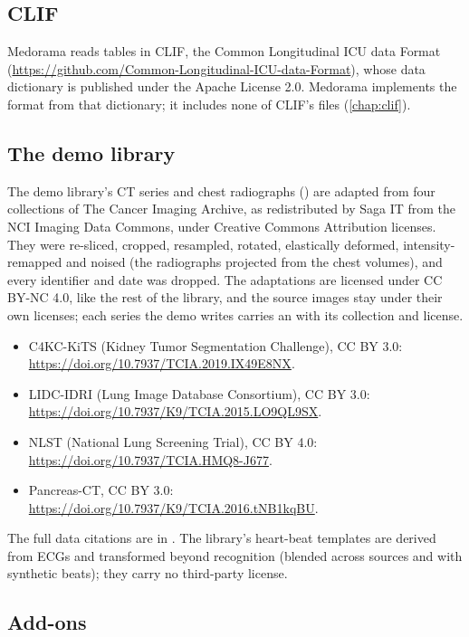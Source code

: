 \subsection{CLIF}
\label{sec:licences-clif}

Medorama reads tables in CLIF, the Common Longitudinal ICU data Format
(\url{https://github.com/Common-Longitudinal-ICU-data-Format}), whose data dictionary is published
under the Apache License 2.0. Medorama implements the format from that dictionary; it includes
none of CLIF's files (\cref{chap:clif}).

\subsection{The demo library}
\label{sec:licences-data}

The demo library's CT series and chest radiographs () are adapted from
four collections of The Cancer Imaging Archive, as redistributed by Saga IT from the NCI Imaging
Data Commons, under Creative Commons Attribution licenses. They were re-sliced, cropped,
resampled, rotated, elastically deformed, intensity-remapped and noised (the radiographs
projected from the chest volumes), and every identifier and date was dropped. The adaptations are
licensed under CC BY-NC 4.0, like the rest of the library, and the source images stay under
their own licenses; each series the demo writes carries an  with its
collection and license.
\begin{itemize}
\item C4KC-KiTS (Kidney Tumor Segmentation Challenge), CC BY 3.0:
  \url{https://doi.org/10.7937/TCIA.2019.IX49E8NX}.
\item LIDC-IDRI (Lung Image Database Consortium), CC BY 3.0:
  \url{https://doi.org/10.7937/K9/TCIA.2015.LO9QL9SX}.
\item NLST (National Lung Screening Trial), CC BY 4.0:
  \url{https://doi.org/10.7937/TCIA.HMQ8-J677}.
\item Pancreas-CT, CC BY 3.0: \url{https://doi.org/10.7937/K9/TCIA.2016.tNB1kqBU}.
\end{itemize}
The full data citations are in . The library's heart-beat
templates are derived from ECGs and transformed beyond recognition (blended across sources and
with synthetic beats); they carry no third-party license.

\subsection{Add-ons}
\label{sec:licences-addons}


